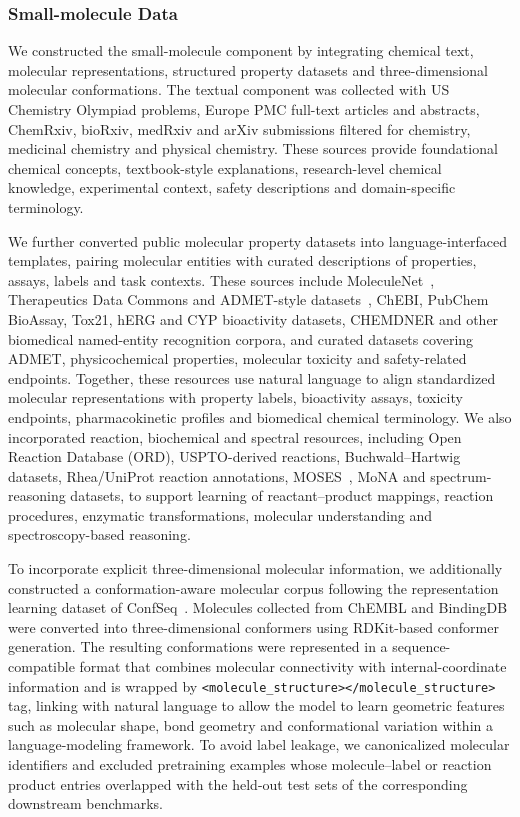 \subsubsection{Small-molecule Data}

We constructed the small-molecule component by integrating chemical text, molecular representations, structured property datasets and three-dimensional molecular conformations. The textual component was collected with US Chemistry Olympiad problems, Europe PMC full-text articles and abstracts, ChemRxiv, bioRxiv, medRxiv and arXiv submissions filtered for chemistry, medicinal chemistry and physical chemistry. These sources provide foundational chemical concepts, textbook-style explanations, research-level chemical knowledge, experimental context, safety descriptions and domain-specific terminology.

We further converted public molecular property datasets into language-interfaced templates, pairing molecular entities with curated descriptions of properties, assays, labels and task contexts. 
These sources include MoleculeNet~\citep{wu2018moleculenet}, Therapeutics Data Commons and ADMET-style datasets~\citep{huang2021therapeutics}, ChEBI, PubChem BioAssay, Tox21, hERG and CYP bioactivity datasets, CHEMDNER and other biomedical named-entity recognition corpora, and curated datasets covering ADMET, physicochemical properties, molecular toxicity and safety-related endpoints. 
Together, these resources use natural language to align standardized molecular representations with property labels, bioactivity assays, toxicity endpoints, pharmacokinetic profiles and biomedical chemical terminology. 
We also incorporated reaction, biochemical and spectral resources, including Open Reaction Database (ORD), USPTO-derived reactions, Buchwald--Hartwig datasets, Rhea/UniProt reaction annotations, MOSES~\citep{10.3389/fphar.2020.565644}, MoNA and spectrum-reasoning datasets, to support learning of reactant--product mappings, reaction procedures, enzymatic transformations, molecular understanding and spectroscopy-based reasoning. 
 

To incorporate explicit three-dimensional molecular information, we additionally constructed a conformation-aware molecular corpus following the representation learning dataset of ConfSeq~\citep{xiong2025bridging}. Molecules collected from ChEMBL and BindingDB were converted into three-dimensional conformers using RDKit-based conformer generation. The resulting conformations were represented in a sequence-compatible format that combines molecular connectivity with internal-coordinate information and is wrapped by \verb|<molecule_structure></molecule_structure>| tag, linking with natural language to allow the model to learn geometric features such as molecular shape, bond geometry and conformational variation within a language-modeling framework. To avoid label leakage, we canonicalized molecular identifiers and excluded pretraining examples whose molecule--label or reaction product entries overlapped with the held-out test sets of the corresponding downstream benchmarks. 

